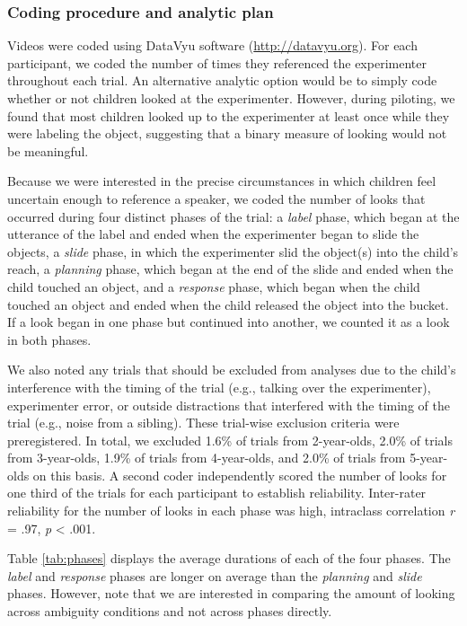 \documentclass[english,,man]{apa6}
\begin{document}
\subsubsection{Coding procedure and analytic
plan}\label{coding-procedure-and-analytic-plan}

Videos were coded using DataVyu software (\url{http://datavyu.org}). For
each participant, we coded the number of times they referenced the
experimenter throughout each trial. An alternative analytic option would
be to simply code whether or not children looked at the experimenter.
However, during piloting, we found that most children looked up to the
experimenter at least once while they were labeling the object,
suggesting that a binary measure of looking would not be meaningful.

Because we were interested in the precise circumstances in which
children feel uncertain enough to reference a speaker, we coded the
number of looks that occurred during four distinct phases of the trial:
a \emph{label} phase, which began at the utterance of the label and
ended when the experimenter began to slide the objects, a \emph{slide}
phase, in which the experimenter slid the object(s) into the child's
reach, a \emph{planning} phase, which began at the end of the slide and
ended when the child touched an object, and a \emph{response} phase,
which began when the child touched an object and ended when the child
released the object into the bucket. If a look began in one phase but
continued into another, we counted it as a look in both phases.

We also noted any trials that should be excluded from analyses due to
the child's interference with the timing of the trial (e.g., talking
over the experimenter), experimenter error, or outside distractions that
interfered with the timing of the trial (e.g., noise from a sibling).
These trial-wise exclusion criteria were preregistered. In total, we
excluded 1.6\% of trials from 2-year-olds, 2.0\% of trials from
3-year-olds, 1.9\% of trials from 4-year-olds, and 2.0\% of trials from
5-year-olds on this basis. A second coder independently scored the
number of looks for one third of the trials for each participant to
establish reliability. Inter-rater reliability for the number of looks
in each phase was high, intraclass correlation \emph{r} = .97, \emph{p}
\textless{} .001.

Table \ref{tab:phases} displays the average durations of each of the
four phases. The \emph{label} and \emph{response} phases are longer on
average than the \emph{planning} and \emph{slide} phases. However, note
that we are interested in comparing the amount of looking across
ambiguity conditions and not across phases directly.
\end{document}
